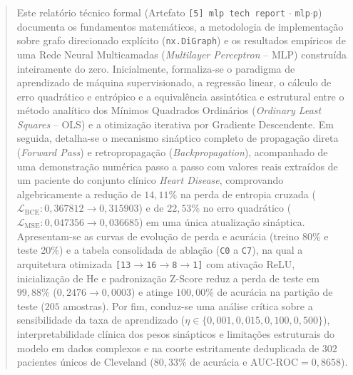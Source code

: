 \documentclass[runningheads]{llncs}
\begin{document}
\begin{abstract}
Este relat\'{o}rio t\'{e}cnico formal (Artefato \texttt{[5] mlp tech report} $\cdot$ \texttt{mlp$\cdot$p}) documenta os fundamentos matem\'{a}ticos, a metodologia de implementa\c{c}\~{a}o sobre grafo direcionado explícito (\texttt{nx.DiGraph}) e os resultados emp\'{i}ricos de uma Rede Neural Multicamadas (\textit{Multilayer Perceptron} -- MLP) constru\'{i}da inteiramente do zero. Inicialmente, formaliza-se o paradigma de aprendizado de m\'{a}quina supervisionado, a regress\~{a}o linear, o c\'{a}lculo de erro quadr\'{a}tico e entr\'{o}pico e a equival\^{e}ncia assint\'{o}tica e estrutural entre o m\'{e}todo anal\'{i}tico dos M\'{i}nimos Quadrados Ordin\'{a}rios (\textit{Ordinary Least Squares} -- OLS) e a otimiza\c{c}\~{a}o iterativa por Gradiente Descendente. Em seguida, detalha-se o mecanismo sin\'{a}ptico completo de propaga\c{c}\~{a}o direta (\textit{Forward Pass}) e retropropaga\c{c}\~{a}o (\textit{Backpropagation}), acompanhado de uma demonstra\c{c}\~{a}o num\'{e}rica passo a passo com valores reais extra\'{i}dos de um paciente do conjunto cl\'{i}nico \textit{Heart Disease}, comprovando algebricamente a redu\c{c}\~{a}o de $14{,}11\%$ na perda de entropia cruzada ($\mathcal{L}_{\text{BCE}}: 0{,}367812 \to 0{,}315903$) e de $22{,}53\%$ no erro quadr\'{a}tico ($\mathcal{L}_{\text{MSE}}: 0{,}047356 \to 0{,}036685$) em uma \'{u}nica atualiza\c{c}\~{a}o sin\'{a}ptica. Apresentam-se as curvas de evolu\c{c}\~{a}o de perda e acur\'{a}cia (treino 80\% e teste 20\%) e a tabela consolidada de abla\c{c}\~{a}o (\texttt{C0} a \texttt{C7}), na qual a arquitetura otimizada \texttt{[13$\to$16$\to$8$\to$1]} com ativa\c{c}\~{a}o ReLU, inicializa\c{c}\~{a}o de He e padroniza\c{c}\~{a}o Z-Score reduz a perda de teste em $99{,}88\%$ ($0{,}2476 \to 0{,}0003$) e atinge $100{,}00\%$ de acur\'{a}cia na parti\c{c}\~{a}o de teste ($205$ amostras). Por fim, conduz-se uma an\'{a}lise cr\'{i}tica sobre a sensibilidade da taxa de aprendizado ($\eta \in \{0{,}001, 0{,}015, 0{,}100, 0{,}500\}$), interpretabilidade cl\'{i}nica dos pesos sin\'{a}pticos e limita\c{c}\~{o}es estruturais do modelo em dados complexos e na coorte estritamente deduplicada de $302$ pacientes \'{u}nicos de Cleveland ($80{,}33\%$ de acur\'{a}cia e $\text{AUC-ROC} = 0{,}8658$).

\end{abstract}
\end{document}
